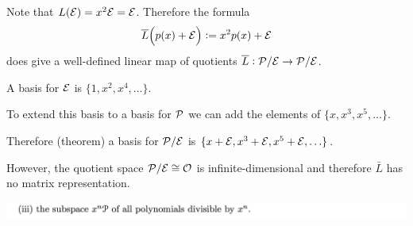 Note that $L(\mathcal E) = x^2\mathcal E = \mathcal E$. Therefore the formula
\begin{align*}
  \overline L\Big(p(x) + \mathcal E\Big) := x^2p(x) + \mathcal E
\end{align*}
does give a well-defined linear map of quotients $\overline L:\mathcal P/\mathcal E \to \mathcal P/\mathcal E$.

A basis for $\mathcal E$ is $\{1, x^2, x^4, \ldots\}$.

To extend this basis to a basis for $\mathcal P$ we can add the elements of $\{x, x^3, x^5, \ldots\}$.

Therefore (theorem) a basis for $\mathcal P/\mathcal E$ is $\{x + \mathcal E, x^3 + \mathcal E, x^5 + \mathcal E, \ldots\}$.

However, the quotient space $\mathcal P/\mathcal E \cong \mathcal O$ is infinite-dimensional and therefore
$\bar L$ has no matrix representation.




\begin{mdframed}
  \includegraphics[width=400pt]{img/linear-algebra-a0-2-2-3.png}
\end{mdframed}

